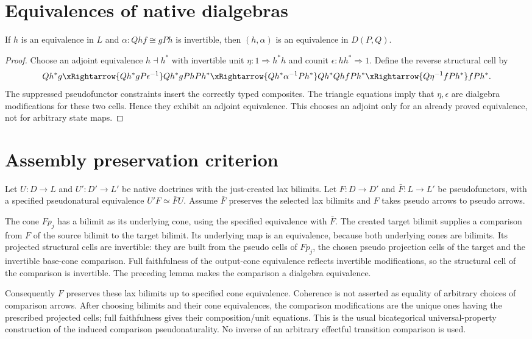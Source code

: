 \documentclass{article}
\begin{document}
\section{Equivalences of native dialgebras}
\begin{lemma}
If $h$ is an equivalence in $L$ and $\alpha:Qh f\cong gPh$ is invertible, then $(h,\alpha)$ is an equivalence in $D(P,Q)$.
\end{lemma}
\begin{proof}
Choose an adjoint equivalence $h\dashv h^*$ with invertible unit $\eta:1\Rightarrow h^*h$ and counit $\epsilon:hh^*\Rightarrow1$. Define the reverse structural cell by
\[
Qh^*g\xRightarrow{Qh^*gP\epsilon^{-1}}
Qh^*gPhPh^*\xRightarrow{Qh^*\alpha^{-1}Ph^*}
Qh^*Qh fPh^*\xRightarrow{Q\eta^{-1}fPh^*}fPh^*.
\]
The suppressed pseudofunctor constraints insert the correctly typed composites. The triangle equations imply that $\eta,\epsilon$ are dialgebra modifications for these two cells. Hence they exhibit an adjoint equivalence. This chooses an adjoint only for an already proved equivalence, not for arbitrary state maps.
\end{proof}

\section{Assembly preservation criterion}
Let $U:D\to L$ and $U':D'\to L'$ be native doctrines with the just-created lax bilimits. Let $F:D\to D'$ and $\bar F:L\to L'$ be pseudofunctors, with a specified pseudonatural equivalence $U'F\simeq\bar F U$. Assume $\bar F$ preserves the selected lax bilimits and $F$ takes pseudo arrows to pseudo arrows.

The cone $Fp_j$ has a bilimit as its underlying cone, using the specified equivalence with $\bar F$. The created target bilimit supplies a comparison from $F$ of the source bilimit to the target bilimit. Its underlying map is an equivalence, because both underlying cones are bilimits. Its projected structural cells are invertible: they are built from the pseudo cells of $Fp_j$, the chosen pseudo projection cells of the target and the invertible base-cone comparison. Full faithfulness of the output-cone equivalence reflects invertible modifications, so the structural cell of the comparison is invertible. The preceding lemma makes the comparison a dialgebra equivalence.

Consequently $F$ preserves these lax bilimits up to specified cone equivalence. Coherence is not asserted as equality of arbitrary choices of comparison arrows. After choosing bilimits and their cone equivalences, the comparison modifications are the unique ones having the prescribed projected cells; full faithfulness gives their composition/unit equations. This is the usual bicategorical universal-property construction of the induced comparison pseudonaturality. No inverse of an arbitrary effectful transition comparison is used.
\end{document}

